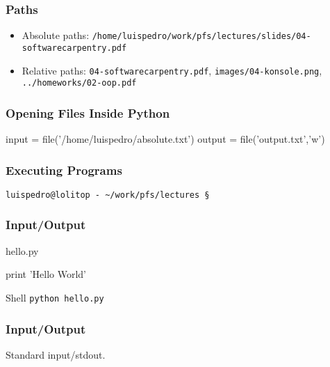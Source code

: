 \begin{frame}[fragile]
\frametitle{Paths}
\begin{itemize}
\item \alert{Absolute paths:} \texttt{/home/luispedro/work/pfs/lectures/slides/04-softwarecarpentry.pdf}
\item \alert{Relative paths:} \texttt{04-softwarecarpentry.pdf}, \texttt{images/04-konsole.png}, \texttt{../homeworks/02-oop.pdf}
\end{itemize}
\end{frame}

\begin{frame}[fragile]
\frametitle{Opening Files Inside Python}

\begin{python}
input = file('/home/luispedro/absolute.txt')
output = file('output.txt','w')
\end{python}
\end{frame}

\begin{frame}[fragile]
\frametitle{Executing Programs}

\begin{verbatim}
luispedro@lolitop - ~/work/pfs/lectures §
\end{verbatim}

\end{frame}

\begin{frame}[fragile]
\frametitle{Input/Output}
\begin{block}{hello.py}
\begin{python}
print 'Hello World'
\end{python}
\end{block}

\begin{block}{Shell}
\texttt{python hello.py}
\end{block}
\end{frame}


\begin{frame}[fragile]
\frametitle{Input/Output}
Standard input/stdout.
\end{frame}

